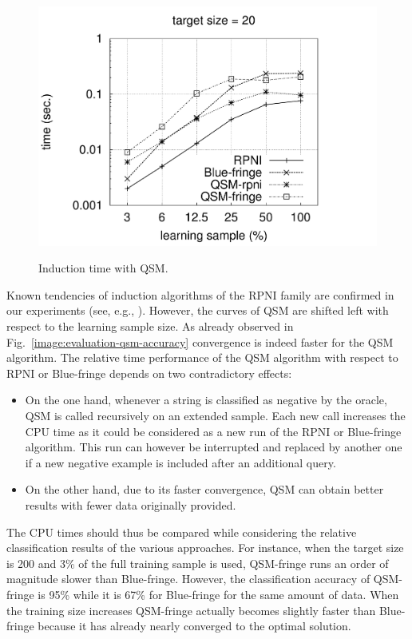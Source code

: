\begin{figure}
{  \includegraphics[trim=30mm 0mm 35mm 0mm, clip, page=4]{src/5-evaluation/images/time}
}
\caption{Induction time with QSM\label{image:evaluation-qsm-time}.}
\end{figure}

Known tendencies of induction algorithms of the RPNI family are confirmed in our experiments (see, e.g., \cite{Lang:1998}). However, the curves of QSM are shifted left with respect to the learning sample size. As already observed in Fig.~\ref{image:evaluation-qsm-accuracy} convergence is indeed faster for the QSM algorithm. The relative time performance of the QSM algorithm with respect to RPNI or Blue-fringe depends on two contradictory effects:
\begin{itemize}
\item On the one hand, whenever a string is classified as negative by the oracle, QSM is called recursively on an extended sample. Each new call increases the CPU time as it could be considered as a new run of the RPNI or Blue-fringe algorithm. This run can however be interrupted and replaced by another one if a new negative example is included after an additional query.
\item On the other hand, due to its faster convergence, QSM can obtain better results with fewer data originally provided. 
\end{itemize}
 
The CPU times should thus be compared while considering the relative classification results of the various approaches. For instance, when the target size is 200 and 3\% of the full training sample is used, QSM-fringe runs an order of magnitude slower than Blue-fringe. However, the classification accuracy of QSM-fringe is 95\% while it is 67\% for Blue-fringe for the same amount of data. When the training size increases QSM-fringe actually becomes slightly faster than Blue-fringe because it has already nearly converged to the optimal solution.

